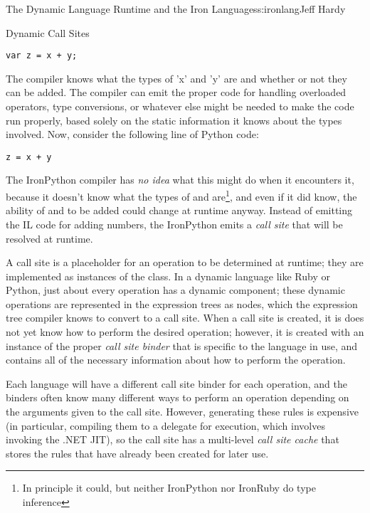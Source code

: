 \begin{aosachapter}{The Dynamic Language Runtime and the Iron Languages}{s:ironlang}{Jeff Hardy}
\begin{aosasect1}{Dynamic Call Sites}
\begin{verbatim}
var z = x + y;
\end{verbatim}

The compiler knows what the types of 'x' and 'y' are and whether or not they
can be added. The compiler can emit the proper code for handling overloaded
operators, type conversions, or whatever else might be needed to make the code
run properly, based solely on the static information it knows about the types
involved. Now, consider the following line of Python code:

\begin{verbatim}
z = x + y
\end{verbatim}

The IronPython compiler has \emph{no idea} what this might do when it
encounters it, because it doesn't know what the types of  and 
are\footnote{In principle it could, but neither IronPython nor IronRuby do type
inference}, and even if it did know, the ability of  and  to be
added could change at runtime anyway. Instead of emitting the IL code for
adding numbers, the IronPython emits a \emph{call site} that will be resolved
at runtime.

A call site is a placeholder for an operation to be determined at runtime; they
are implemented as instances of the
 class. In a dynamic language
like Ruby or Python, just about every operation has a dynamic component; these
dynamic operations are represented in the expression trees as
 nodes, which the expression tree compiler knows to
convert to a call site. When a call site is created, it is does not yet know
how to perform the desired operation; however, it is created with an instance
of the proper \emph{call site binder} that is specific to the language in use,
and contains all of the necessary information about how to perform the
operation.


Each language will have a different call site binder for each operation, and
the binders often know many different ways to perform an operation depending on
the arguments given to the call site. However, generating these rules is
expensive (in particular, compiling them to a delegate for execution, which
involves invoking the .NET JIT), so the call site has a multi-level \emph{call
site cache} that stores the rules that have already been created for later use.


\end{aosasect1}
\end{aosachapter}
